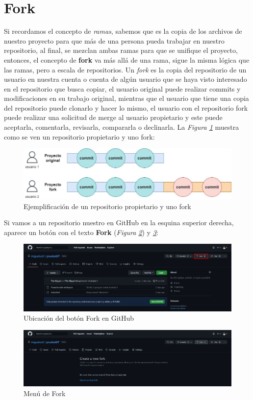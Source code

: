 \section{Fork}
\hspace{0.55cm}Si recordamos el concepto de \textit{ramas}, sabemos que es la copia de los archivos de nuestro proyecto para que más de una persona pueda trabajar en nuestro repositorio, al final, se mezclan ambas ramas para que se unifique el proyecto, entonces, el concepto de \textbf{fork} va más allá de una rama, sigue la misma lógica que las ramas, pero a escala de repositorios. Un \textit{fork} es la copia del repositorio de un usuario en nuestra cuenta o cuenta de algún usuario que se haya visto interesado en el repositorio que busca copiar, el usuario original puede realizar commits y modificaciones en su trabajo original, mientras que el usuario que tiene una copia del repositorio puede clonarlo y hacer lo mismo, el usuario con el repositorio fork puede realizar una solicitud de merge al usuario propietario y este puede aceptarla, comentarla, revisarla, compararla o declinarla. La \textit{Figura \ref{fig: 35}} muestra como se ven un repositorio propietario y uno fork:
\begin{figure}[H]
    \centering
    \caption{Ejemplificación de un repositorio propietario y uno fork}
    \label{fig: 35}
    \includegraphics[width=13cm]{capturas/fork1.jpg}
\end{figure}

Si vamos a un repositorio nuestro en GitHub en la esquina superior derecha, aparece un botón con el texto \textbf{Fork} (\textit{Figura \ref{fig: 36}}) y \textit{\ref{fig: 37}}:
\begin{figure}[H]
    \centering
    \caption{Ubicación del botón Fork en GitHub}
    \label{fig: 36}
    \includegraphics[width=13cm]{capturas/fork2.png}
\end{figure}
\begin{figure}[H]
    \centering
    \caption{Menú de Fork}
    \label{fig: 37}
    \includegraphics[width=13cm]{capturas/fork3.png}
\end{figure}

